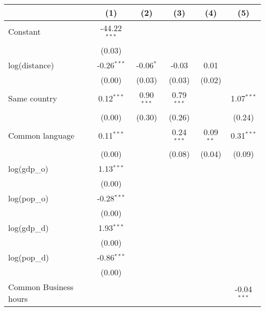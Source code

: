 
\begingroup
\centering
\small
\begin{tabular}{lccccc}
   \toprule
                            & (1)            & (2)          & (3)          & (4)         & (5)\\  
   \midrule 
   Constant                 & -44.22$^{***}$ &              &              &             &   \\   
                            & (0.03)         &              &              &             &   \\   
   log(distance)            & -0.26$^{***}$  & -0.06$^{*}$  & -0.03        & 0.01        &   \\   
                            & (0.00)         & (0.03)       & (0.03)       & (0.02)      &   \\   
   Same country             & 0.12$^{***}$   & 0.90$^{***}$ & 0.79$^{***}$ &             & 1.07$^{***}$\\   
                            & (0.00)         & (0.30)       & (0.26)       &             & (0.24)\\   
   Common language          & 0.11$^{***}$   &              & 0.24$^{***}$ & 0.09$^{**}$ & 0.31$^{***}$\\   
                            & (0.00)         &              & (0.08)       & (0.04)      & (0.09)\\   
   log(gdp\_o)              & 1.13$^{***}$   &              &              &             &   \\   
                            & (0.00)         &              &              &             &   \\   
   log(pop\_o)              & -0.28$^{***}$  &              &              &             &   \\   
                            & (0.00)         &              &              &             &   \\   
   log(gdp\_d)              & 1.93$^{***}$   &              &              &             &   \\   
                            & (0.00)         &              &              &             &   \\   
   log(pop\_d)              & -0.86$^{***}$  &              &              &             &   \\   
                            & (0.00)         &              &              &             &   \\   
   Common Business hours    &                &              &              &             & -0.04$^{***}$\\   

\end{tabular}
